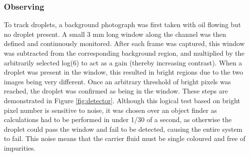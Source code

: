 \documentclass{physics_article_B}
\begin{document}
            
        \subsubsection{Observing}
        
                To track droplets, a background photograph was first taken with oil flowing but no droplet present. A small 3 mm long window along the channel was then defined and continuously monitored. After each frame was captured, this window was subtracted from the corresponding background region, and multiplied by the arbitrarily selected log(6) to act as a gain (thereby increasing contrast). When a droplet was present in the window, this resulted in bright regions due to the two images being very different. Once an arbitrary threshold of bright pixels was reached, the droplet was confirmed as being in the window. These steps are demonstrated in Figure \ref{fig:detector}. Although this logical test based on bright pixel number is sensitive to noise, it was chosen over an object finder as calculations had to be performed in under 1/30 of a second, as otherwise the droplet could pass the window and fail to be detected, causing the entire system to fail. This noise means that the carrier fluid must be single coloured and free of impurities. \\
            
\end{document}
